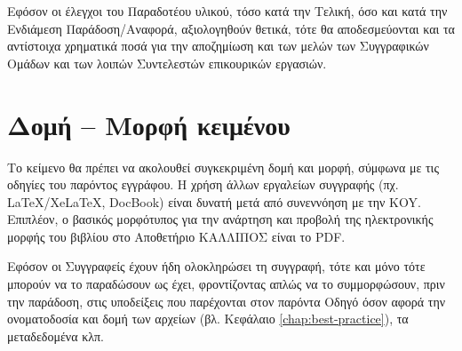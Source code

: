 Εφόσον οι έλεγχοι του Παραδοτέου υλικού, τόσο κατά την Τελική, όσο και κατά την
Ενδιάμεση Παράδοση/Αναφορά, αξιολογηθούν θετικά, τότε θα αποδεσμεύονται και τα
αντίστοιχα χρηματικά ποσά για την αποζημίωση και των μελών των Συγγραφικών Ομάδων
και των λοιπών Συντελεστών επικουρικών εργασιών.

\section{Δομή – Μορφή κειμένου}
Το κείμενο θα πρέπει να ακολουθεί συγκεκριμένη δομή και μορφή, σύμφωνα με τις
οδηγίες του παρόντος εγγράφου. Η χρήση άλλων εργαλείων
συγγραφής (πχ. LaTeX/XeLaTeX, DocBook) είναι δυνατή μετά από συνεννόηση με την
KOY. Επιπλέον, ο βασικός μορφότυπος για την ανάρτηση και προβολή της ηλεκτρονικής
μορφής του βιβλίου στο Αποθετήριο ΚΑΛΛΙΠΟΣ είναι το PDF.

Εφόσον οι Συγγραφείς έχουν ήδη ολοκληρώσει τη συγγραφή, τότε και μόνο τότε
μπορούν να το παραδώσουν ως έχει, φροντίζοντας απλώς να το συμμορφώσουν, πριν
την παράδοση, στις υποδείξεις που παρέχονται στον παρόντα Οδηγό όσον αφορά την
ονοματοδοσία και δομή των αρχείων (βλ. Κεφάλαιο \ref{chap:best-practice}), τα μεταδεδομένα κλπ.

